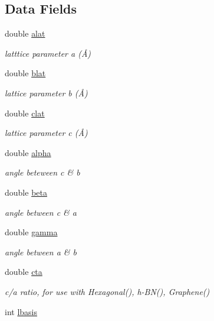 \subsection*{Data Fields}
\begin{DoxyCompactItemize}
\item 
double \hyperlink{class_reader_ae27e67c8d78fb8fac565ec079529b589}{alat}
\begin{DoxyCompactList}\small\item\em latttice parameter a (Å) \end{DoxyCompactList}\item 
double \hyperlink{class_reader_a8e2240f9ad9a7c1423e0888e474f4c9e}{blat}
\begin{DoxyCompactList}\small\item\em lattice parameter b (Å) \end{DoxyCompactList}\item 
double \hyperlink{class_reader_ad10c6e643d5cb651bed0c96790099b51}{clat}
\begin{DoxyCompactList}\small\item\em lattice parameter c (Å) \end{DoxyCompactList}\item 
double \hyperlink{class_reader_a421cb70a4a8746a68fe2618ed597c5a0}{alpha}
\begin{DoxyCompactList}\small\item\em angle beteween c \& b \end{DoxyCompactList}\item 
double \hyperlink{class_reader_a47234e1e633f932334c4304cf01824a1}{beta}
\begin{DoxyCompactList}\small\item\em angle between c \& a \end{DoxyCompactList}\item 
double \hyperlink{class_reader_ab2127a4e365fd3528c017a76375d60c4}{gamma}
\begin{DoxyCompactList}\small\item\em angle between a \& b \end{DoxyCompactList}\item 
double \hyperlink{class_reader_a6eb90d21148a08f9ef4e3dc478917d63}{cta}
\begin{DoxyCompactList}\small\item\em c/a ratio, for use with Hexagonal(), h-\/\+B\+N(), Graphene() \end{DoxyCompactList}\item 
int \hyperlink{class_reader_afd2686bb2f2f9eec9601287385d7159e}{lbasis}

\end{DoxyCompactItemize}

